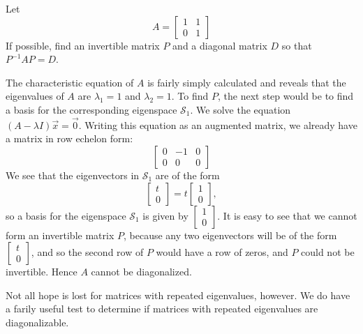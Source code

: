 \documentclass{ximera}
\begin{document}
  \begin{example}\label{ex:impossiblediagonalize}
  Let
  \begin{equation*}
  A =
  \begin{bmatrix}
  1 & 1 \\
  0 & 1
  \end{bmatrix}
  \end{equation*}
  If possible, find an invertible matrix $P$ and a diagonal matrix $D$ so that $P^{-1}AP=D$.
   
   
  \begin{explanation}
  The characteristic equation of $A$ is fairly simply calculated and reveals that the eigenvalues of $A$ are $\lambda_1 =1$ and  $\lambda_2=1$.
  To find $P$, the next step would be to find a basis for the corresponding eigenspace $\mathcal{S}_1$.  We solve the equation $\left( A - \lambda I \right) \vec{x} = \vec{0}$.
  Writing this equation as an augmented matrix, we already have a matrix in row echelon form:
  \begin{equation*}
  \left[\begin{array}{cc|c} 
  0 & -1 & 0 \\
  0 & 0 & 0
   \end{array}\right]
  \end{equation*}
  We see that the eigenvectors in $\mathcal{S}_1$ are of the form
  $$
  \begin{bmatrix}
  t \\
  0
  \end{bmatrix}
  =t\begin{bmatrix}
  1 \\
  0
  \end{bmatrix},
  $$
  so a basis for the eigenspace $\mathcal{S}_1$ is given by
  $\begin{bmatrix}
  1 \\
  0
  \end{bmatrix}$.
  It is easy to see that we cannot form an invertible matrix $P$, because any two eigenvectors will be of the form
  $\begin{bmatrix}
  t \\
  0
  \end{bmatrix}$,
  and so the second row of $P$ would have a row of zeros, and $P$ could not be invertible.  Hence $A$ cannot be diagonalized.
  \end{explanation}
  \end{example}
  
  Not all hope is lost for matrices with repeated eigenvalues, however. We do have a farily useful test to determine if matrices with repeated eigenvalues are diagonalizable.
   
\end{document}
